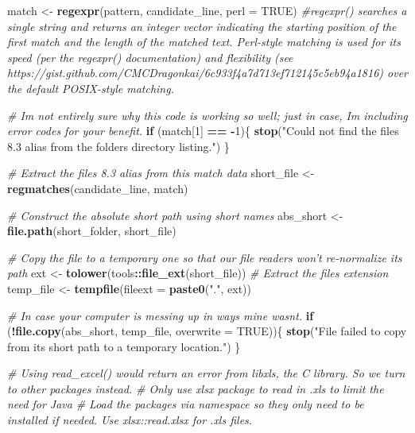 \documentclass[
]{article}
\newenvironment{Shaded}{\begin{snugshade}}{\end{snugshade}}
\newcommand{\AttributeTok}[1]{\textcolor[rgb]{0.13,0.29,0.53}{#1}}
\newcommand{\CommentTok}[1]{\textcolor[rgb]{0.56,0.35,0.01}{\textit{#1}}}
\newcommand{\ConstantTok}[1]{\textcolor[rgb]{0.56,0.35,0.01}{#1}}
\newcommand{\ControlFlowTok}[1]{\textcolor[rgb]{0.13,0.29,0.53}{\textbf{#1}}}
\newcommand{\DecValTok}[1]{\textcolor[rgb]{0.00,0.00,0.81}{#1}}
\newcommand{\FunctionTok}[1]{\textcolor[rgb]{0.13,0.29,0.53}{\textbf{#1}}}
\newcommand{\NormalTok}[1]{#1}
\newcommand{\OtherTok}[1]{\textcolor[rgb]{0.56,0.35,0.01}{#1}}
\newcommand{\SpecialCharTok}[1]{\textcolor[rgb]{0.81,0.36,0.00}{\textbf{#1}}}
\newcommand{\StringTok}[1]{\textcolor[rgb]{0.31,0.60,0.02}{#1}}
\begin{document}
\begin{Shaded}
\begin{Highlighting}[]
\NormalTok{  match }\OtherTok{\textless{}{-}} \FunctionTok{regexpr}\NormalTok{(pattern, candidate\_line, }\AttributeTok{perl =} \ConstantTok{TRUE}\NormalTok{) }\CommentTok{\#regexpr() searches a single string and returns an integer vector indicating the starting position of the first match and the length of the matched text. Perl{-}style matching is used for its speed (per the regexpr() documentation) and flexibility (see https://gist.github.com/CMCDragonkai/6c933f4a7d713ef712145c5eb94a1816) over the default POSIX{-}style matching.}
  
  \CommentTok{\# I\textquotesingle{}m not entirely sure why this code is working so well; just in case, I\textquotesingle{}m including error codes for your benefit.}
  \ControlFlowTok{if}\NormalTok{ (match[}\DecValTok{1}\NormalTok{] }\SpecialCharTok{==} \SpecialCharTok{{-}}\DecValTok{1}\NormalTok{)\{}
    \FunctionTok{stop}\NormalTok{(}\StringTok{"Could not find the file\textquotesingle{}s 8.3 alias from the folder\textquotesingle{}s directory listing."}\NormalTok{)}
\NormalTok{  \}}
  
  \CommentTok{\# Extract the file\textquotesingle{}s 8.3 alias from this match data}
\NormalTok{  short\_file }\OtherTok{\textless{}{-}} \FunctionTok{regmatches}\NormalTok{(candidate\_line, match)}
  
  \CommentTok{\# Construct the absolute short path using short names}
\NormalTok{  abs\_short }\OtherTok{\textless{}{-}} \FunctionTok{file.path}\NormalTok{(short\_folder, short\_file)}
  
  \CommentTok{\# Copy the file to a temporary one so that our file readers won’t re{-}normalize its path}
\NormalTok{  ext }\OtherTok{\textless{}{-}} \FunctionTok{tolower}\NormalTok{(tools}\SpecialCharTok{::}\FunctionTok{file\_ext}\NormalTok{(short\_file)) }\CommentTok{\# Extract the file\textquotesingle{}s extension}
\NormalTok{  temp\_file }\OtherTok{\textless{}{-}} \FunctionTok{tempfile}\NormalTok{(}\AttributeTok{fileext =} \FunctionTok{paste0}\NormalTok{(}\StringTok{"."}\NormalTok{, ext))}
  
  \CommentTok{\# In case your computer is messing up in ways mine wasn\textquotesingle{}t.}
  \ControlFlowTok{if}\NormalTok{ (}\SpecialCharTok{!}\FunctionTok{file.copy}\NormalTok{(abs\_short, temp\_file, }\AttributeTok{overwrite =} \ConstantTok{TRUE}\NormalTok{))\{}
    \FunctionTok{stop}\NormalTok{(}\StringTok{"File failed to copy from its short path to a temporary location."}\NormalTok{)}
\NormalTok{  \}}
  
  \CommentTok{\# Using read\_excel() would return an error from libxls, the C library. So we turn to other packages instead.}
  \CommentTok{\# Only use xlsx package to read in .xls to limit the need for Java}
  \CommentTok{\# Load the packages via namespace so they only need to be installed if needed. Use xlsx::read.xlsx for .xls files.}
  

\end{Highlighting}
\end{Shaded}
\end{document}
